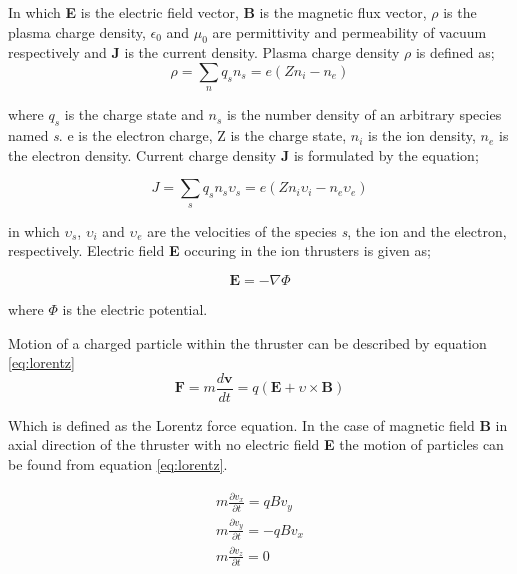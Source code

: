 In which \textbf{E} is the electric field vector, \textbf{B} is the magnetic flux vector, $\rho$ is the plasma charge density, $\epsilon_0$ and $\mu_0$ are permittivity and permeability of vacuum respectively and \textbf{J} is the current density\cite{goebel2008fundamentals}. Plasma charge density $\rho$ is defined as;
\begin{equation}
    \rho = \sum_{n} q_s n_s = e (Z n_i - n_e)
    \label{eq:plasmacharge}
\end{equation}

where $q_s$ is the charge state and $n_s$ is the number density of an arbitrary species named \textit{s}. e is the electron charge, Z is the charge state, $n_i$ is the ion density, $n_e$ is the electron density. Current charge density \textbf{J} is formulated by the equation\cite{goebel2008fundamentals};

\begin{equation}
    J = \sum_{s} q_s n_s \upsilon_s = e (Z n_i \upsilon_i - n_e \upsilon_e)
    \label{eq:currentchargedensity}
\end{equation}

in which $\upsilon_s$, $\upsilon_i$ and $\upsilon_e$ are the velocities of the species \textit{s}, the ion and the electron, respectively. Electric field \textbf{E} occuring in the ion thrusters is given as\cite{Couch2017};

\begin{equation}
    \mathbf{E} = - \nabla \varPhi 
\end{equation}

where $\varPhi$ is the electric potential.

\par Motion of a charged particle within the thruster can be described by equation \ref{eq:lorentz}
\begin{equation}
    \mathbf{F} = m\frac{d\mathbf{v}}{dt} = q(\mathbf{E}+\upsilon \times \mathbf{B})
    \label{eq:lorentz}
\end{equation}

Which is defined as the Lorentz force equation\cite{goebel2008fundamentals}. In the case of magnetic field \textbf{B} in axial direction of the thruster with no electric field \textbf{E} the motion of particles can be found from equation \ref{eq:lorentz}.

\begin{equation}
    \begin{aligned}  
m\frac{\partial v_x}{\partial t} = q B v_y \\
m\frac{\partial v_y}{\partial t} = -q B v_x \\
m\frac{\partial v_z}{\partial t} = 0 \\
\end{aligned}
\label{eq:lorentzxdir}
\end{equation}

